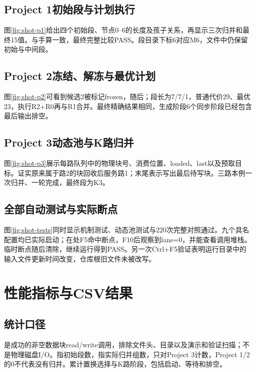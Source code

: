 \subsection{Project 1初始段与计划执行}
图\ref{fig:shot-p1}给出四个初始段、节点0--6的长度及孩子关系，再显示三次归并和最终15值。与手算一致，最终完整比较PASS。段目录下标6对应M6，文件中仍保留初始与中间段。

\subsection{Project 2冻结、解冻与最优计划}
图\ref{fig:shot-p2}可看到候选2被标记frozen，随后；段长为7/7/1，普通代价29、最优23，执行R2+R0再与R1合并。最终精确结果相同，生成阶段6个同步阶段已经包含最后输出排空。

\subsection{Project 3动态池与K路归并}
图\ref{fig:shot-p3}展示每路队列中的物理块号、消费位置、loaded、last以及预取目标。证实原来属于路2的块回收后服务路1；末尾表示写出最后待写块。三路本例一次归并、一轮完成，最终段为K3。

\subsection{全部自动测试与实际断点}
图\ref{fig:shot-tests}同时显示机制测试、动态池测试与220次完整对照通过。九个具名配置均已实际启动；在处F5命中断点，F10后观察到lane=0，并能查看调用堆栈。临时断点随后清除，继续运行得到PASS。另一次Ctrl+F5验证表明运行目录中的输入文件更新时间改变，仓库根旧文件未被改写。

\section{性能指标与CSV结果}
\subsection{统计口径}
是成功的非空数据块read/write调用，排除文件头、目录以及演示和验证扫描；不是物理磁盘I/O。指初始段数，指实际归并组数，只对Project 3计数，Project 1/2的0不代表没有归并。累计置换选择与K路阶段，包括启动、等待和排空。

